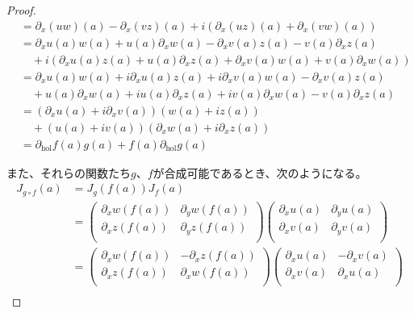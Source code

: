 \documentclass[dvipdfmx]{jsarticle}
\begin{document}
\begin{proof}
\begin{align*}
&= \partial_{x}(uw)(a) - \partial_{x}(vz)(a) + i\left( \partial_{x}(uz)(a) + \partial_{x}(vw)(a) \right)\\
&= \partial_{x}u(a)w(a) + u(a)\partial_{x}w(a) - \partial_{x}v(a)z(a) - v(a)\partial_{x}z(a) \\
&\quad + i\left( \partial_{x}u(a)z(a) + u(a)\partial_{x}z(a) + \partial_{x}v(a)w(a) + v(a)\partial_{x}w(a) \right)\\
&= \partial_{x}u(a)w(a) + i\partial_{x}u(a)z(a) + i\partial_{x}v(a)w(a) - \partial_{x}v(a)z(a) \\
&\quad + u(a)\partial_{x}w(a) + iu(a)\partial_{x}z(a) + iv(a)\partial_{x}w(a) - v(a)\partial_{x}z(a)\\
&= \left( \partial_{x}u(a) + i\partial_{x}v(a) \right)\left( w(a) + iz(a) \right) \\
&\quad + \left( u(a) + iv(a) \right)\left( \partial_{x}w(a) + i\partial_{x}z(a) \right)\\
&= \partial_{\mathrm{hol}}f(a)g(a) + f(a)\partial_{\mathrm{hol}}g(a)
\end{align*}\par
また、それらの関数たち$g$、$f$が合成可能であるとき、次のようになる。
\begin{align*}
J_{g \circ f}(a) &= J_{g}\left( f(a) \right)J_{f}(a)\\
&= \begin{pmatrix}
\partial_{x}w\left( f(a) \right) & \partial_{y}w\left( f(a) \right) \\
\partial_{x}z\left( f(a) \right) & \partial_{y}z\left( f(a) \right) \\
\end{pmatrix}\begin{pmatrix}
\partial_{x}u(a) & \partial_{y}u(a) \\
\partial_{x}v(a) & \partial_{y}v(a) \\
\end{pmatrix}\\
&= \begin{pmatrix}
\partial_{x}w\left( f(a) \right) & - \partial_{x}z\left( f(a) \right) \\
\partial_{x}z\left( f(a) \right) & \partial_{x}w\left( f(a) \right) \\
\end{pmatrix}\begin{pmatrix}
\partial_{x}u(a) & - \partial_{x}v(a) \\
\partial_{x}v(a) & \partial_{x}u(a) \\
\end{pmatrix}\\

\end{align*}
\end{proof}
\end{document}
